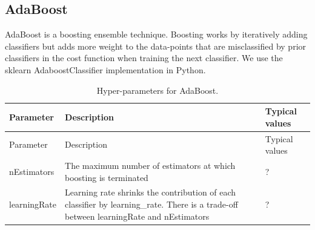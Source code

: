 \documentclass[11pt]{book}
\theoremstyle{definition}
\theoremstyle{definition}
\theoremstyle{definition}
\theoremstyle{remark}
\begin{document}
\hypertarget{adaboost}{%
\subsection{AdaBoost}\label{adaboost}}

AdaBoost is a boosting ensemble technique. Boosting works by iteratively adding classifiers but adds more weight to the data-points that are misclassified by prior classifiers in the cost function when training the next classifier. We use the sklearn AdaboostClassifier implementation in Python.  

\begin{longtable}[]{@{}lll@{}}
\caption{\label{tab:adaBoostParameters} Hyper-parameters for AdaBoost.}\tabularnewline
\toprule
\begin{minipage}[b]{0.23\columnwidth}\raggedright
Parameter\strut
\end{minipage} & \begin{minipage}[b]{0.30\columnwidth}\raggedright
Description\strut
\end{minipage} & \begin{minipage}[b]{0.38\columnwidth}\raggedright
Typical values\strut
\end{minipage}\tabularnewline
\midrule
\endfirsthead
\toprule
\begin{minipage}[b]{0.23\columnwidth}\raggedright
Parameter\strut
\end{minipage} & \begin{minipage}[b]{0.30\columnwidth}\raggedright
Description\strut
\end{minipage} & \begin{minipage}[b]{0.38\columnwidth}\raggedright
Typical values\strut
\end{minipage}\tabularnewline
\midrule
\endhead
\begin{minipage}[t]{0.23\columnwidth}\raggedright
nEstimators\strut
\end{minipage} & \begin{minipage}[t]{0.30\columnwidth}\raggedright
The maximum number of estimators at which boosting is terminated\strut
\end{minipage} & \begin{minipage}[t]{0.38\columnwidth}\raggedright
?\strut
\end{minipage}\tabularnewline
\begin{minipage}[t]{0.23\columnwidth}\raggedright
learningRate\strut
\end{minipage} & \begin{minipage}[t]{0.30\columnwidth}\raggedright
Learning rate shrinks the contribution of each classifier by learning\_rate. There is a trade-off between learningRate and nEstimators\strut
\end{minipage} & \begin{minipage}[t]{0.38\columnwidth}\raggedright
?\strut
\end{minipage}\tabularnewline
\bottomrule
\end{longtable}
\end{document}
